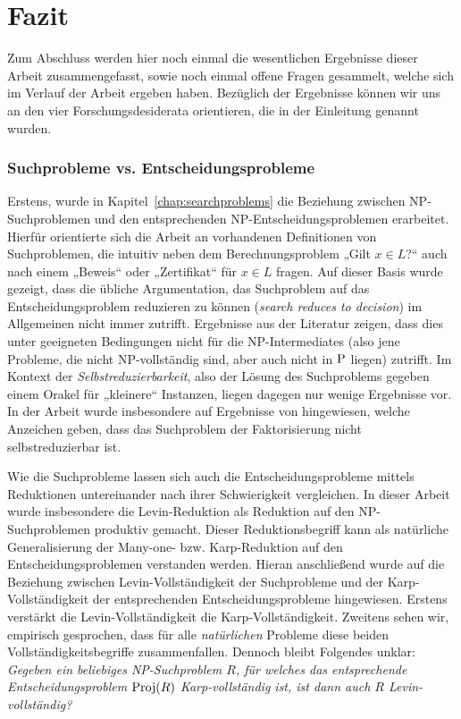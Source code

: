 \chapter{Fazit}\label{chap:conclusion}

Zum Abschluss werden hier noch einmal die wesentlichen Ergebnisse dieser Arbeit zusammengefasst, sowie noch einmal offene Fragen gesammelt, welche sich im Verlauf der Arbeit ergeben haben.
Bezüglich der Ergebnisse können wir uns an den vier Forschungsdesiderata orientieren, die in der Einleitung genannt wurden.

\subsection*{Suchprobleme vs. Entscheidungsprobleme}

Erstens, wurde in Kapitel~\ref{chap:searchproblems} die Beziehung zwischen NP-Suchproblemen und den entsprechenden NP-Entscheidungsproblemen erarbeitet.
Hierfür orientierte sich die Arbeit an vorhandenen Definitionen von Suchproblemen, die intuitiv neben dem Berechnungsproblem „Gilt $x\in L$?“ auch nach einem „Beweis“ oder „Zertifikat“ für $x\in L$ fragen. 
Auf dieser Basis wurde gezeigt, dass die übliche Argumentation, das Suchproblem auf das Entscheidungsproblem reduzieren zu können (\emph{search reduces to decision}) im Allgemeinen nicht immer zutrifft. Ergebnisse aus der Literatur zeigen, dass dies unter geeigneten Bedingungen nicht für die NP-Intermediates (also jene Probleme, die nicht NP-vollständig sind, aber auch nicht in $\P$ liegen) zutrifft.
Im Kontext der \emph{Selbstreduzierbarkeit}, also der Lösung des Suchproblems gegeben einem Orakel für „kleinere“ Instanzen, liegen dagegen nur wenige Ergebnisse vor. In der Arbeit wurde insbesondere auf Ergebnisse von \textcite{harsha_downward_2023} hingewiesen, welche Anzeichen geben, dass das Suchproblem der Faktorisierung nicht selbstreduzierbar ist.

Wie die Suchprobleme lassen sich auch die Entscheidungsprobleme mittels Reduktionen untereinander nach ihrer Schwierigkeit vergleichen. In dieser Arbeit wurde insbesondere die Levin-Reduktion als Reduktion auf den NP-Suchproblemen produktiv gemacht. Dieser Reduktionsbegriff kann als natürliche Generalisierung der Many-one- bzw. Karp-Reduktion auf den Entscheidungsproblemen verstanden werden. Hieran anschließend wurde auf die Beziehung zwischen Levin-Vollständigkeit der Suchprobleme und der Karp-Vollständigkeit der entsprechenden Entscheidungsprobleme hingewiesen. Erstens verstärkt die Levin-Vollständigkeit die Karp-Vollständigkeit. Zweitens sehen wir, empirisch gesprochen, dass für alle \emph{natürlichen} Probleme diese beiden Vollständigkeitsbegriffe zusammenfallen. 
Dennoch bleibt Folgendes unklar: \emph{Gegeben ein beliebiges NP-Suchproblem $R$, für welches das entsprechende Entscheidungsproblem $\Proj(R)$ Karp-vollständig ist, ist dann auch $R$ Levin-vollständig?}

